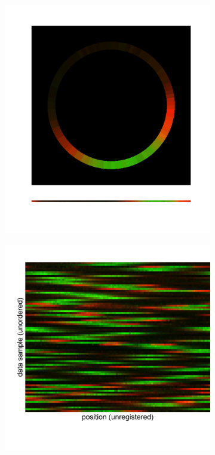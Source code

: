 \documentclass[11pt]{article}
\begin{document}
\begin{figure}
\begin{subfigure}{0.17\textwidth}
\includegraphics[width=\textwidth]{illustrate_1d}
\caption{}
\label{subfig:1d_image_example}
\end{subfigure}
\begin{subfigure}{0.2\textwidth}
\includegraphics[width=\textwidth]{unregistered_unordered_1d}

\end{subfigure}
\end{figure}
\end{document}
